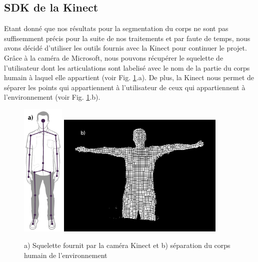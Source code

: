 \subsection{SDK de la Kinect}
Etant donné que nos résultats pour la segmentation du corps ne sont pas suffisemment précis pour la suite de nos traitements et par faute de
temps, nous avons décidé d'utiliser les outils fournis avec la Kinect pour continuer le projet. Grâce à la caméra de Microsoft, nous pouvons
récupérer le squelette de l'utilisateur dont les articulations sont labelisé avec le nom de la partie du corps humain à laquel elle appartient
(voir Fig. \ref{fig:kinect}.a). De plus, la Kinect nous permet de séparer les points qui appartiennent à l'utilisateur de ceux qui appartiennent
à l'environnement (voir Fig. \ref{fig:kinect}.b).\\

\begin{figure}[!ht]
  \begin{center}
    \includegraphics[width=2cm]{image/kinectSkeleton.png} 
    \includegraphics[width=8cm]{image/seg1.PNG}
    \caption{a) Squelette fournit par la caméra Kinect et b) séparation du corps humain de l'environnement}
    \label{fig:kinect}
  \end{center}
\end{figure}

